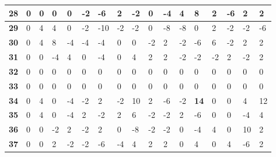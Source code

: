 \begin{longtable}[c]{|l|l|l|l|l|l|l|l|l|l|l|l|l|l|l|l|l|}
\textbf{28} & 0          & 0          & 0          & 0          & -2         & -6         & 2          & -2         & 0          & -4         & 4           & 8           & 2           & -6          & 2           & 2           \\ \hline
\textbf{29} & 0          & 4          & 4          & 0          & -2         & -10        & -2         & -2         & 0          & -8         & -8          & 0           & 2           & -2          & -2          & -6          \\ \hline
\textbf{30} & 0          & 4          & 8          & -4         & -4         & -4         & 0          & 0          & -2         & 2          & -2          & -6          & 6           & -2          & 2           & 2           \\ \hline
\textbf{31} & 0          & 0          & -4         & 4          & 0          & -4         & 0          & 4          & 2          & 2          & -2          & -2          & -2          & 2           & -2          & 2           \\ \hline
\textbf{32} & 0          & 0          & 0          & 0          & 0          & 0          & 0          & 0          & 0          & 0          & 0           & 0           & 0           & 0           & 0           & 0           \\ \hline
\textbf{33} & 0          & 0          & 0          & 0          & 0          & 0          & 0          & 0          & 0          & 0          & 0           & 0           & 0           & 0           & 0           & 0           \\ \hline
\textbf{34} & 0          & 4          & 0          & -4         & -2         & 2          & -2         & 10         & 2          & -6         & -2          & \textbf{14}          & 0           & 0           & 4           & 12          \\ \hline
\textbf{35} & 0          & 4          & 0          & -4         & 2          & -2         & 2          & 6          & -2         & -2         & 2           & -6          & 0           & 0           & -4          & 4           \\ \hline
\textbf{36} & 0          & 0          & -2         & 2          & -2         & 2          & 0          & -8         & -2         & -2         & 0           & -4          & 4           & 0           & 10          & 2           \\ \hline
\textbf{37} & 0          & 0          & 2          & -2         & -2         & -6         & -4         & 4          & 2          & 2          & 0           & 4           & 0           & 4           & -6          & 2           \\ \hline

\end{longtable}
